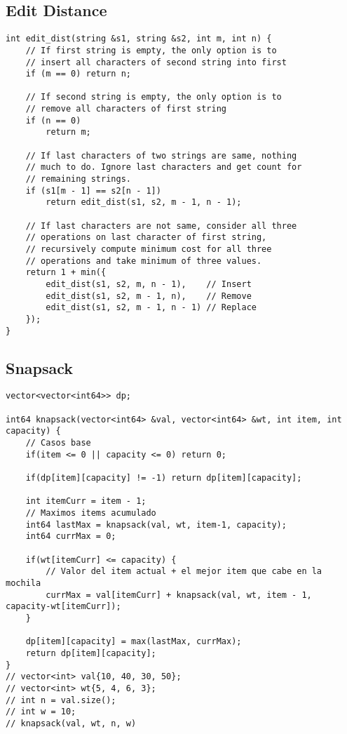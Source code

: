 \documentclass[10pt,letterpaper,twocolumn,twosided]{article}
\begin{document}
\subsection{Edit Distance}
\begin{lstlisting}
int edit_dist(string &s1, string &s2, int m, int n) {
    // If first string is empty, the only option is to
    // insert all characters of second string into first
    if (m == 0) return n;

    // If second string is empty, the only option is to
    // remove all characters of first string
    if (n == 0)
        return m;
 
    // If last characters of two strings are same, nothing
    // much to do. Ignore last characters and get count for
    // remaining strings.
    if (s1[m - 1] == s2[n - 1])
        return edit_dist(s1, s2, m - 1, n - 1);
 
    // If last characters are not same, consider all three
    // operations on last character of first string,
    // recursively compute minimum cost for all three
    // operations and take minimum of three values.
    return 1 + min({
        edit_dist(s1, s2, m, n - 1),    // Insert
        edit_dist(s1, s2, m - 1, n),    // Remove
        edit_dist(s1, s2, m - 1, n - 1) // Replace
    });
}
\end{lstlisting}

\subsection{Snapsack}
\begin{lstlisting}
vector<vector<int64>> dp;

int64 knapsack(vector<int64> &val, vector<int64> &wt, int item, int capacity) {
    // Casos base
    if(item <= 0 || capacity <= 0) return 0;

    if(dp[item][capacity] != -1) return dp[item][capacity];
    
    int itemCurr = item - 1;
    // Maximos items acumulado
    int64 lastMax = knapsack(val, wt, item-1, capacity);
    int64 currMax = 0;

    if(wt[itemCurr] <= capacity) {
        // Valor del item actual + el mejor item que cabe en la mochila
        currMax = val[itemCurr] + knapsack(val, wt, item - 1, capacity-wt[itemCurr]);
    }

    dp[item][capacity] = max(lastMax, currMax);
    return dp[item][capacity];
}
// vector<int> val{10, 40, 30, 50};
// vector<int> wt{5, 4, 6, 3};
// int n = val.size();
// int w = 10;
// knapsack(val, wt, n, w)
\end{lstlisting}
\end{document}
